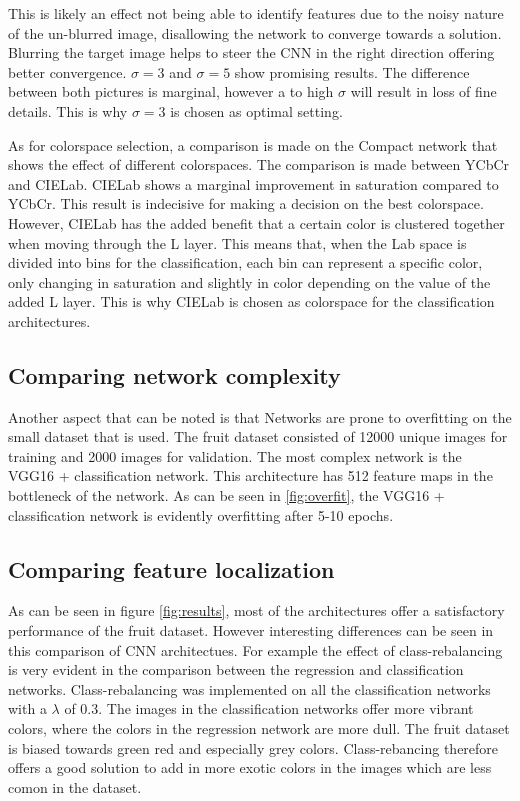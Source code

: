 {\color{red}
This is likely an effect not being able to identify features due to the noisy nature of the un-blurred image, disallowing the network to converge towards a solution. Blurring the target image helps to steer the CNN in the right direction offering better convergence. $\sigma = 3$ and $\sigma = 5$ show promising results. The difference between both pictures is marginal, however a to high $\sigma$ will result in loss of fine details. This is why $\sigma = 3$ is chosen as optimal setting.}

As for colorspace selection, a comparison is made on the Compact network that shows the effect of different colorspaces. The comparison is made between YCbCr and CIELab. CIELab shows a marginal improvement in saturation compared to YCbCr. This result is indecisive for making a decision on the best colorspace. However, CIELab has the added benefit that a certain color is clustered together when moving through the L layer. This means that, when the Lab space is divided into bins for the classification, each bin can represent a specific color, only changing in saturation and slightly in color depending on the value of the added L layer. This is why CIELab is chosen as colorspace for the classification architectures.


\subsection{Comparing network complexity}
Another aspect that can be noted is that Networks are prone to overfitting on the small dataset that is used. The fruit dataset consisted of 12000 unique images for training and 2000 images for validation. The most complex network is the VGG16 + classification network. This architecture has 512 feature maps in the bottleneck of the network. As can be seen in \ref{fig:overfit}, the VGG16 + classification network is evidently overfitting after 5-10 epochs. 

\subsection{Comparing feature localization}
As can be seen in figure \ref{fig:results}, most of the architectures offer a satisfactory performance of the fruit dataset. However interesting differences can be seen in this comparison of CNN architectues. For example the effect of class-rebalancing is very evident in the comparison between the regression and classification networks. Class-rebalancing was implemented on all the classification networks with a $\lambda$ of 0.3. The images in the classification networks offer more vibrant colors, where the colors in the regression network are more dull. The fruit dataset is biased towards green red and especially grey colors. Class-rebancing therefore offers a good solution to add in more exotic colors in the images which are less comon in the dataset.

